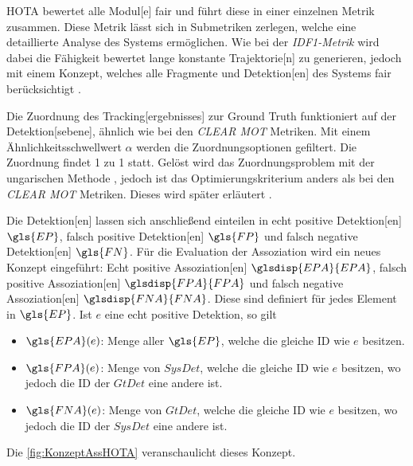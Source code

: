 \gls{HOTA} bewertet alle \gls{Modul}[e] fair und führt diese in einer einzelnen Metrik zusammen. Diese Metrik lässt sich in Submetriken zerlegen, welche eine detaillierte Analyse des Systems ermöglichen. Wie bei der \textit{\gls{IDF1}-Metrik} wird dabei die Fähigkeit bewertet lange konstante \gls{Trajektorie}[n] zu generieren, jedoch mit einem Konzept, welches alle Fragmente und \gls{Detektion}[en] des Systems fair berücksichtigt \cite{HOTA}. \par

Die Zuordnung des \gls{Tracking}[ergebnisses] zur \gls{Ground Truth} funktioniert auf der \gls{Detektion}[sebene], ähnlich wie bei den \textit{\acrshort{CLEAR} \gls{MOT}} Metriken. Mit einem Ähnlichkeitsschwellwert \(\alpha\) werden die Zuordnungsoptionen gefiltert. Die Zuordnung findet 1 zu 1 statt. Gelöst wird das Zuordnungsproblem mit der ungarischen Methode \cite{Kuhn.1955}, jedoch ist das Optimierungskriterium anders als bei den \textit{\acrshort{CLEAR} \gls{MOT}} Metriken. Dieses wird später erläutert \cite{HOTA}. \par

Die \gls{Detektion}[en] lassen sich anschließend einteilen in echt positive \gls{Detektion}[en] \(\gls{EP}\), falsch positive \gls{Detektion}[en] \(\gls{FP}\) und falsch negative \gls{Detektion}[en] \(\gls{FN}\). Für die Evaluation der \gls{Assoziation} wird ein neues Konzept eingeführt: Echt positive \gls{Assoziation}[en] \(\glsdisp{EPA}{EPA}\), falsch positive \gls{Assoziation}[en] \(\glsdisp{FPA}{FPA}\) und falsch negative \gls{Assoziation}[en] \(\glsdisp{FNA}{FNA}\). Diese sind definiert für jedes Element in \(\gls{EP}\). Ist \(e\) eine echt positive \gls{Detektion}, so gilt

\begin{itemize}
    \item \(\gls{EPA}(e)\): Menge aller \(\gls{EP}\), welche die gleiche \acrshort{ID} wie \(e\) besitzen.
    \item \(\gls{FPA}(e)\): Menge von \(SysDet\), welche die gleiche \acrshort{ID} wie \(e\) besitzen, wo jedoch die \acrshort{ID} der \(GtDet\) eine andere ist.
    \item \(\gls{FNA}(e)\): Menge von \(GtDet\), welche die gleiche \acrshort{ID} wie \(e\) besitzen, wo jedoch die \acrshort{ID} der \(SysDet\) eine andere ist.
\end{itemize}

Die \autoref{fig:KonzeptAssHOTA} veranschaulicht dieses Konzept.
    
